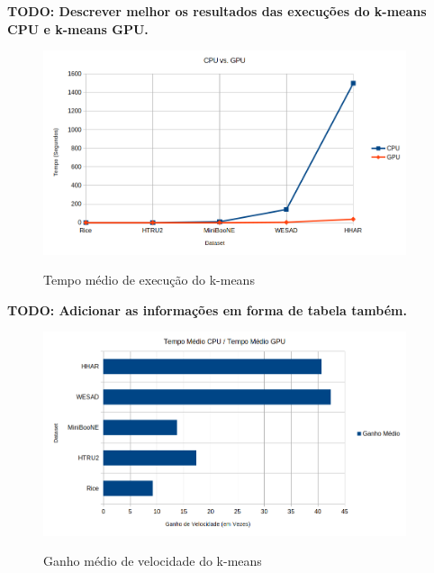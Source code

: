 \documentclass[12pt,
openright, 
oneside, %
a4paper,    %
brazil]{facom-ufu-abntex2}
\begin{document}
\textbf{TODO: Descrever melhor os resultados das execuções do k-means CPU e k-means GPU.}


\begin{figure}[h]
  \caption{Tempo médio de execução do k-means}
  \centering
  \includegraphics[width=0.95\textwidth]{kMeansAvgTime.png}
  \label{fig:kMeansAvgTime}
\end{figure}

\textbf{TODO: Adicionar as informações em forma de tabela também.}

\begin{figure}[h]
  \caption{Ganho médio de velocidade do k-means}
  \centering
  \includegraphics[width=0.95\textwidth]{kMeansAvgSpeedup.png}
  \label{fig:kMeansAvgSpeedup}
\end{figure}

\end{document}
